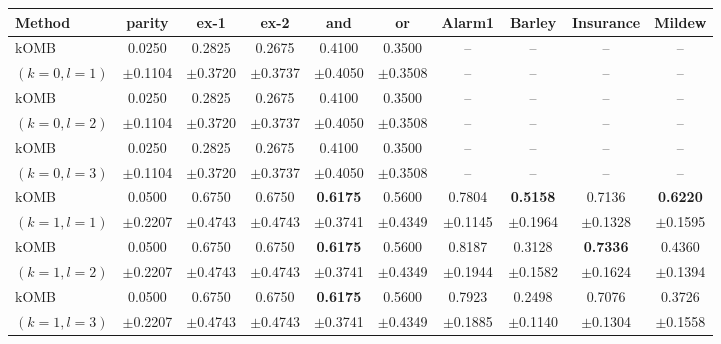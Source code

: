 \setlength{\tabcolsep}{5pt}
\begin{tabular}{lccccccccc}
\toprule
Method & parity & ex-1 & ex-2 & and & or & Alarm1 & Barley & Insurance & Mildew \\
\midrule

kOMB
& 0.0250 & 0.2825 & 0.2675 & 0.4100 & 0.3500 & -- & -- & -- & -- \\
{\scriptsize $(k=0,l=1)$} & {\scriptsize $\pm$0.1104} & {\scriptsize $\pm$0.3720} & {\scriptsize $\pm$0.3737} & {\scriptsize $\pm$0.4050} & {\scriptsize $\pm$0.3508} & -- & -- & -- & -- \\

kOMB
& 0.0250 & 0.2825 & 0.2675 & 0.4100 & 0.3500 & -- & -- & -- & -- \\
{\scriptsize $(k=0,l=2)$} & {\scriptsize $\pm$0.1104} & {\scriptsize $\pm$0.3720} & {\scriptsize $\pm$0.3737} & {\scriptsize $\pm$0.4050} & {\scriptsize $\pm$0.3508} & -- & -- & -- & -- \\

kOMB
& 0.0250 & 0.2825 & 0.2675 & 0.4100 & 0.3500 & -- & -- & -- & -- \\
{\scriptsize $(k=0,l=3)$} & {\scriptsize $\pm$0.1104} & {\scriptsize $\pm$0.3720} & {\scriptsize $\pm$0.3737} & {\scriptsize $\pm$0.4050} & {\scriptsize $\pm$0.3508} & -- & -- & -- & -- \\

kOMB
& 0.0500 & 0.6750 & 0.6750 & \textbf{0.6175} & 0.5600 & 0.7804 & \textbf{0.5158} & 0.7136 & \textbf{0.6220} \\
{\scriptsize $(k=1,l=1)$} & {\scriptsize $\pm$0.2207} & {\scriptsize $\pm$0.4743} & {\scriptsize $\pm$0.4743} & {\scriptsize $\pm$0.3741} & {\scriptsize $\pm$0.4349} & {\scriptsize $\pm$0.1145} & {\scriptsize $\pm$0.1964} & {\scriptsize $\pm$0.1328} & {\scriptsize $\pm$0.1595} \\

kOMB
& 0.0500 & 0.6750 & 0.6750 & \textbf{0.6175} & 0.5600 & 0.8187 & 0.3128 & \textbf{0.7336} & 0.4360 \\
{\scriptsize $(k=1,l=2)$} & {\scriptsize $\pm$0.2207} & {\scriptsize $\pm$0.4743} & {\scriptsize $\pm$0.4743} & {\scriptsize $\pm$0.3741} & {\scriptsize $\pm$0.4349} & {\scriptsize $\pm$0.1944} & {\scriptsize $\pm$0.1582} & {\scriptsize $\pm$0.1624} & {\scriptsize $\pm$0.1394} \\

kOMB
& 0.0500 & 0.6750 & 0.6750 & \textbf{0.6175} & 0.5600 & 0.7923 & 0.2498 & 0.7076 & 0.3726 \\
{\scriptsize $(k=1,l=3)$} & {\scriptsize $\pm$0.2207} & {\scriptsize $\pm$0.4743} & {\scriptsize $\pm$0.4743} & {\scriptsize $\pm$0.3741} & {\scriptsize $\pm$0.4349} & {\scriptsize $\pm$0.1885} & {\scriptsize $\pm$0.1140} & {\scriptsize $\pm$0.1304} & {\scriptsize $\pm$0.1558} \\


\end{tabular}
